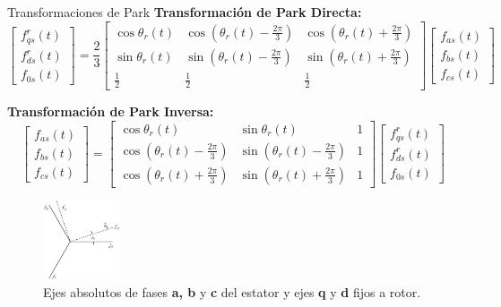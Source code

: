 \documentclass[12pt]{beamer}
\begin{document}
\begin{frame}{Transformaciones de Park}\footnotesize
\textbf{Transformación de Park Directa:}
\begin{equation}
\begin{bmatrix}
    f_{qs}^r(t) \\ f_{ds}^r(t) \\ f_{0s}(t)
\end{bmatrix} = \frac{2}{3}
\begin{bmatrix}
    \cos\theta_r(t) & \cos(\theta_r(t) - \frac{2\pi}{3}) & \cos(\theta_r(t) + \frac{2\pi}{3}) \\
    \sin\theta_r(t) & \sin(\theta_r(t) - \frac{2\pi}{3}) & \sin(\theta_r(t) + \frac{2\pi}{3}) \\
    \frac{1}{2} & \frac{1}{2} & \frac{1}{2}
\end{bmatrix}
\begin{bmatrix}
    f_{as}(t) \\ f_{bs}(t) \\ f_{cs}(t)
\end{bmatrix}
\end{equation}

\textbf{Transformación de Park Inversa:}
\begin{equation}
\begin{bmatrix}
    f_{as}(t) \\ f_{bs}(t) \\ f_{cs}(t)
\end{bmatrix} =
\begin{bmatrix}
    \cos\theta_r(t) & \sin\theta_r(t) & 1 \\
    \cos(\theta_r(t) - \frac{2\pi}{3}) & \sin(\theta_r(t) - \frac{2\pi}{3}) & 1 \\
    \cos(\theta_r(t) + \frac{2\pi}{3}) & \sin(\theta_r(t) + \frac{2\pi}{3}) & 1
\end{bmatrix}
\begin{bmatrix}
    f_{qs}^r(t) \\ f_{ds}^r(t) \\ f_{0s}(t)
\end{bmatrix}
\end{equation}

\begin{figure}[h]
    \centering
    \includegraphics[width=0.2\textwidth]{Imagenes/CoordVirtuales.jpg}
    \caption{Ejes absolutos de fases \textbf{a, b} y \textbf{c} del estator y ejes \textbf{q} y \textbf{d} fijos a rotor.}
\end{figure}
\end{frame}
\end{document}
